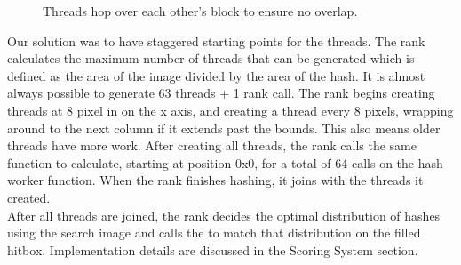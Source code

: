 \documentclass[10pt, journal]{vgtc}                %
\newcommand\tab[1][1cm]{\hspace*{#1}}
\begin{document}
\begin{flushleft}
\begin{figure}[h!]
	\caption{Threads hop over each other's block to ensure no overlap.}
\end{figure}
\tab Our solution was to have staggered starting points for the threads. The rank calculates the maximum number of threads that can be generated which is defined as the area of the image divided by the area of the hash. It is almost always possible to generate 63 threads + 1 rank call. The rank begins creating threads at 8 pixel in on the x axis, and creating a thread every 8 pixels, wrapping around to the next column if it extends past the bounds. This also means older threads have more work. After creating all threads, the rank calls the same function to calculate, starting at position 0x0, for a total of 64 calls on the hash worker function. When the rank finishes hashing, it joins with the threads it created. \\\smallskip
\tab After all threads are joined, the rank decides the optimal distribution of hashes using the search image and calls the  to match that distribution on the filled hitbox. Implementation details are discussed in the Scoring System section.
\end{flushleft}
\end{document}
